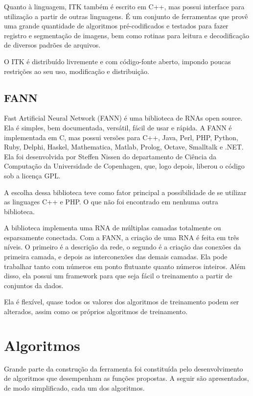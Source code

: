 Quanto à linguagem, ITK também é escrito em C++, mas possui interface para utilização a partir de outras linguagens. É um conjunto de ferramentas que provê uma grande quantidade de algoritmos pré-codificados e testados para fazer registro e segmentação de imagens, bem como rotinas para leitura e decodificação de diversos padrões de arquivos.

O ITK é distribuído livremente e com código-fonte aberto, impondo poucas restrições ao seu uso, modificação e distribuição.

\subsection{FANN}

Fast Artificial Neural Network (FANN) é uma biblioteca de RNAs open source. Ela é simples, bem documentada, versátil, fácil de usar e rápida. A FANN é implementada em C, mas possui versões para C++, Java, Perl, PHP, Python, Ruby, Delphi, Haskel, Mathematica, Matlab, Prolog, Octave, Smalltalk e .NET. Ela foi desenvolvida por Steffen Nissen do departamento de Ciência da Computação da Universidade de Copenhagen, que, logo depois, liberou o código sob a licença GPL.

A escolha dessa biblioteca teve como fator principal a possibilidade de se utilizar as linguages C++ e PHP. O que não foi encontrado em nenhuma outra biblioteca.

A biblioteca implementa uma RNA de múltiplas camadas totalmente ou esparsamente conectada. Com a FANN, a criação de uma RNA é feita em três níveis. O primeiro é a descrição da rede, o segundo é a criação das conexões da primeira camada, e depois as interconexões das demais camadas. Ela pode trabalhar tanto com números em ponto flutuante quanto números inteiros. Além disso, ela possui um framework para que seja fácil o treinamento a partir de conjuntos da dados.

Ela é flexível, quase todos os valores dos algoritmos de treinamento podem ser alterados, assim como os próprios algoritmos de treinamento.

\section{Algoritmos}

Grande parte da construção da ferramenta foi constituída pelo desenvolvimento de algoritmos que desempenham as funções propostas. A seguir são apresentados, de modo simplificado, cada um dos algoritmos.

